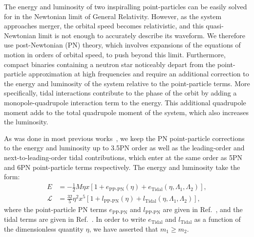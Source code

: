 \documentclass[twocolumn,prd,amssymb,aps,nofootinbib,showpacs,epsf]{revtex4}
\begin{document}
The energy and luminosity of two inspiralling point-particles can be easily solved for in the Newtonian limit of General Relativity.  However, as the system approaches merger, the orbital speed becomes relativistic, and this quasi-Newtonian limit is not enough to accurately describe its waveform.  We therefore use post-Newtonian (PN) theory, which involves expansions of the equations of motion in orders of orbital speed, to push beyond this limit.  Furthermore, compact binaries containing a neutron star noticeably depart from the point-particle approximation at high frequencies and require an additional correction to the energy and luminosity of the system relative to the point-particle terms.  More specifically, tidal interactions contribute to the phase of the orbit by adding a monopole-quadrupole interaction term to the energy.  This additional quadrupole moment adds to the total quadrupole moment of the system, which also increases the luminosity.

As was done in most previous works~\cite{WadeCreightonOchsner2014, DelPozzoLiAgathos2013, Favata2014, YagiYunes2014}, we keep the PN point-particle corrections to the energy and luminosity up to 3.5PN order as well as the leading-order and next-to-leading-order tidal contributions, which enter at the same order as 5PN and 6PN point-particle terms respectively.  The energy and luminosity take the form:
\begin{align}
E &= - \frac{1}{2} M \eta x \left[1 + e_\text{PP-PN}(\eta) + e_\text{Tidal}(\eta, \Lambda_1, \Lambda_2)\right], \\
\mathcal{L} &= \frac{32}{5}\eta^2 x^5 \left[ 1 + l_\text{PP-PN}(\eta) + l_\text{Tidal}(\eta, \Lambda_1, \Lambda_2)\right],
\end{align}
where the point-particle PN terms $e_\text{PP-PN}$ and $l_\text{PP-PN}$ are given in Ref.~\cite{Blanchet2014Review}, and the tidal terms are given in Ref.~\cite{WadeCreightonOchsner2014}.  In order to write $e_\text{Tidal}$ and $l_\text{Tidal}$ as a function of the dimensionless quantity $\eta$, we have asserted that $m_1 \ge m_2$.
\end{document}
